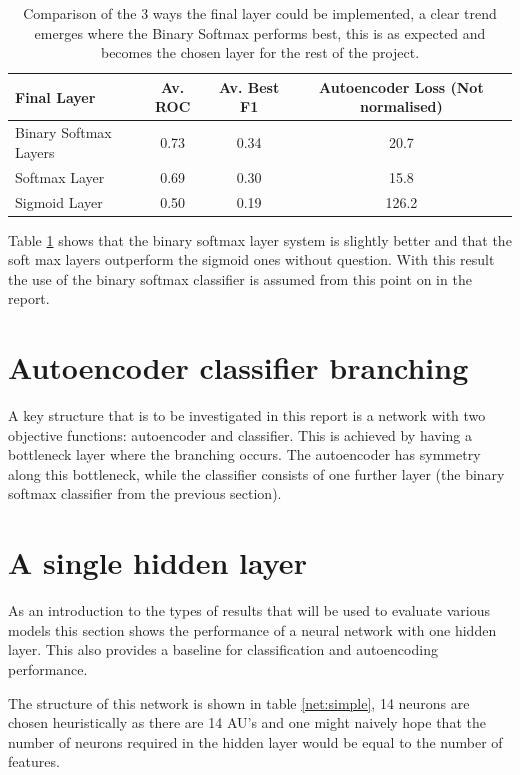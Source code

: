\documentclass[11pt,twoside]{report}
\begin{document}
\begin{table}[!h] {\small
  \centering
  \begin{tabular}{lccc}
  \hline
  Final Layer   & Av. ROC &   Av. Best F1 &   Autoencoder Loss (Not normalised) \\
  \hline
  Binary Softmax Layers  &   0.73 &  0.34 &   20.7 \\
  Softmax Layer          &   0.69 &  0.30 &   15.8 \\
  Sigmoid Layer          &   0.50 &  0.19 &  126.2 \\
  \hline
  \end{tabular}
\caption{Comparison of the 3 ways the final layer could be implemented,
         a clear trend emerges where the Binary Softmax performs best,
         this is as expected and becomes the chosen layer for the rest of the project.} \label{tab:softmax} }
\end{table}

Table \ref{tab:softmax} shows that the binary softmax layer system is slightly better
and that the soft max layers outperform the sigmoid ones without question. With this
result the use of the binary softmax classifier is assumed from this point on in the report.
\section{Autoencoder classifier branching}
A key structure that is to be investigated in this report is a network with two objective functions:
autoencoder and classifier. This is achieved by having a bottleneck layer where the branching occurs.
The autoencoder has symmetry along this bottleneck, while the classifier consists of one further layer
(the binary softmax classifier from the previous section).
\section{A single hidden layer}
As an introduction to the types of results that will be used to evaluate various
models this section shows the performance of a neural network with one
hidden layer. This also provides a baseline for classification and autoencoding performance.

The structure of this network is shown in table \ref{net:simple}, 14 neurons
are chosen heuristically as there are 14 AU's and one might naively hope that the number of
neurons required in the hidden layer would be equal to the number of features.
\end{document}
